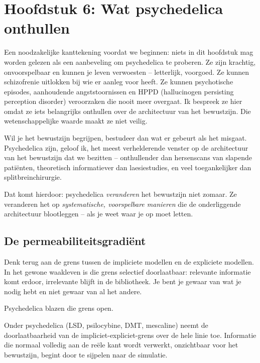 \documentclass[11pt, twoside, openright]{book}
\begin{document}
\chapter*{Hoofdstuk 6: Wat psychedelica onthullen}

Een noodzakelijke kanttekening voordat we beginnen: niets in dit hoofdstuk mag worden gelezen als een aanbeveling om psychedelica te proberen. Ze zijn krachtig, onvoorspelbaar en kunnen je leven verwoesten -- letterlijk, voorgoed. Ze kunnen schizofrenie uitlokken bij wie er aanleg voor heeft. Ze kunnen psychotische episodes, aanhoudende angststoornissen en HPPD (hallucinogen persisting perception disorder) veroorzaken die nooit meer overgaat. Ik bespreek ze hier omdat ze iets belangrijks onthullen over de architectuur van het bewustzijn. Die wetenschappelijke waarde maakt ze niet veilig.

Wil je het bewustzijn begrijpen, bestudeer dan wat er gebeurt als het misgaat. Psychedelica zijn, geloof ik, het meest verhelderende venster op de architectuur van het bewustzijn dat we bezitten -- onthullender dan hersenscans van slapende patiënten, theoretisch informatiever dan laesiestudies, en veel toegankelijker dan splitbreinchirurgie.

Dat komt hierdoor: psychedelica \textit{veranderen} het bewustzijn niet zomaar. Ze veranderen het op \textit{systematische, voorspelbare manieren} die de onderliggende architectuur blootleggen -- als je weet waar je op moet letten.

\section*{De permeabiliteitsgradiënt}

Denk terug aan de grens tussen de impliciete modellen en de expliciete modellen. In het gewone waakleven is die grens selectief doorlaatbaar: relevante informatie komt erdoor, irrelevante blijft in de bibliotheek. Je bent je gewaar van wat je nodig hebt en niet gewaar van al het andere.

Psychedelica blazen die grens open.

Onder psychedelica (LSD, psilocybine, DMT, mescaline) neemt de doorlaatbaarheid van de impliciet-expliciet-grens over de hele linie toe. Informatie die normaal volledig aan de reële kant wordt verwerkt, onzichtbaar voor het bewustzijn, begint door te sijpelen naar de simulatie.
\end{document}
